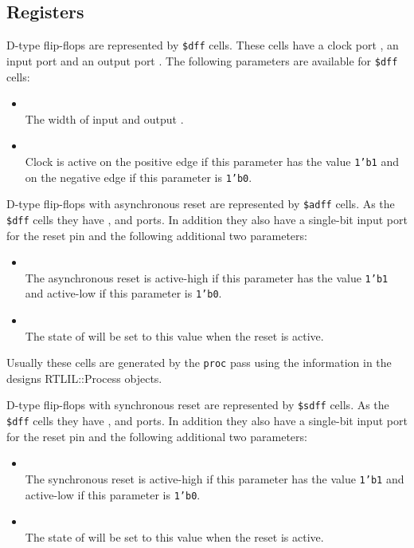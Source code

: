 \subsection{Registers}

D-type flip-flops are represented by {\tt \$dff} cells. These cells have a clock port ,
an input port  and an output port . The following parameters are available for {\tt \$dff}
cells:

\begin{itemize}
\item {} \\
The width of input  and output .

\item {} \\
Clock is active on the positive edge if this parameter has the value {\tt 1'b1} and on the negative
edge if this parameter is {\tt 1'b0}.
\end{itemize}

D-type flip-flops with asynchronous reset are represented by {\tt \$adff} cells. As the {\tt \$dff}
cells they have ,  and  ports. In addition they also have a single-bit 
input port for the reset pin and the following additional two parameters:

\begin{itemize}
\item {} \\
The asynchronous reset is active-high if this parameter has the value {\tt 1'b1} and active-low
if this parameter is {\tt 1'b0}.

\item {} \\
The state of  will be set to this value when the reset is active.
\end{itemize}

\begin{sloppypar}
Usually these cells are generated by the {\tt proc} pass using the information
in the designs RTLIL::Process objects.
\end{sloppypar}

D-type flip-flops with synchronous reset are represented by {\tt \$sdff} cells. As the {\tt \$dff}
cells they have ,  and  ports. In addition they also have a single-bit 
input port for the reset pin and the following additional two parameters:

\begin{itemize}
\item {} \\
The synchronous reset is active-high if this parameter has the value {\tt 1'b1} and active-low
if this parameter is {\tt 1'b0}.

\item {} \\
The state of  will be set to this value when the reset is active.
\end{itemize}

